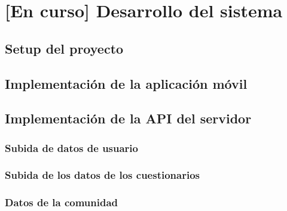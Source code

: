\chapter{[En curso] Desarrollo del sistema}
    \label{chapter:desarrollo}

    
    \section{Setup del proyecto}

    \section{Implementación de la aplicación móvil}

    \section{Implementación de la API del servidor}

        \subsection{Subida de datos de usuario}

        \subsection{Subida de los datos de los cuestionarios}

        \subsection{Datos de la comunidad}

